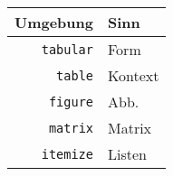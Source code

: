 
\begin{tabular}{r|l}
	Umgebung & Sinn \\
	\hline
	{\tt tabular} & Form \\
	{\tt table} & Kontext \\
	{\tt figure} & Abb. \\
	{\tt matrix} & Matrix \\
	{\tt itemize} & Listen \\
\end{tabular}
